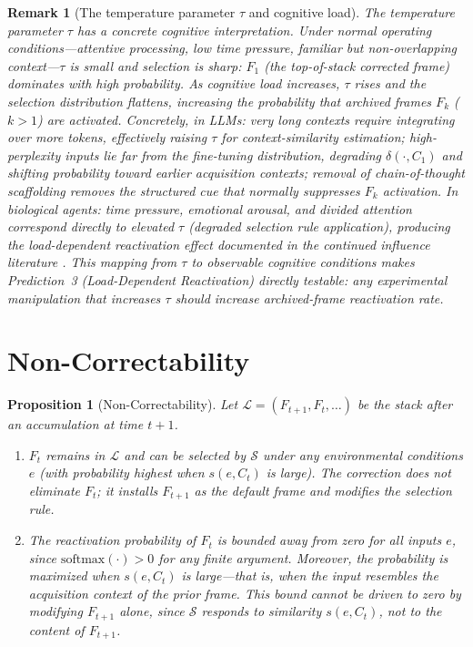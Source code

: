 \documentclass[12pt]{article}
\newtheorem{proposition}{Proposition}
\newtheorem{remark}{Remark}
\begin{document}
\begin{remark}[The temperature parameter $\tau$ and cognitive load]
The temperature parameter $\tau$ has a concrete cognitive interpretation.
Under normal operating conditions---attentive processing, low time pressure,
familiar but non-overlapping context---$\tau$ is small and selection is sharp:
$F_1$ (the top-of-stack corrected frame) dominates with high probability.
As cognitive load increases, $\tau$ rises and the selection distribution
flattens, increasing the probability that archived frames $F_k$ ($k > 1$)
are activated.
Concretely, in LLMs: very long contexts require integrating over more
tokens, effectively raising $\tau$ for context-similarity estimation;
high-perplexity inputs lie far from the fine-tuning distribution,
degrading $\delta(\cdot, C_1)$ and shifting probability toward earlier
acquisition contexts; removal of chain-of-thought scaffolding removes
the structured cue that normally suppresses $F_k$ activation.
In biological agents: time pressure, emotional arousal, and divided
attention correspond directly to elevated $\tau$ (degraded selection
rule application), producing the load-dependent reactivation effect
documented in the continued influence literature \cite{ecker2022}.
This mapping from $\tau$ to observable cognitive conditions makes
Prediction~3 (Load-Dependent Reactivation) directly testable:
any experimental manipulation that increases $\tau$ should increase
archived-frame reactivation rate.
\end{remark}


\section{Non-Correctability}

\begin{proposition}[Non-Correctability]
\label{prop:non-correct}
Let $\mathcal{L} = (F_{t+1}, F_t, \ldots)$ be the stack after an
accumulation at time $t+1$.
\begin{enumerate}
  \item $F_t$ remains in $\mathcal{L}$ and can be selected by
    $\mathcal{S}$ under any environmental conditions $e$
    (with probability highest when $s(e, C_t)$ is large).
    The correction does not eliminate $F_t$; it installs $F_{t+1}$
    as the default frame and modifies the selection rule.
  \item The reactivation probability of $F_t$ is bounded away from
    zero for \emph{all} inputs $e$, since $\mathrm{softmax}(\cdot) > 0$
    for any finite argument.
    Moreover, the probability is \emph{maximized} when $s(e, C_t)$
    is large---that is, when the input resembles the acquisition context
    of the prior frame.
    This bound cannot be driven to zero by modifying $F_{t+1}$ alone,
    since $\mathcal{S}$ responds to similarity $s(e, C_t)$, not to the
    content of $F_{t+1}$.
\end{enumerate}
\end{proposition}
\end{document}
